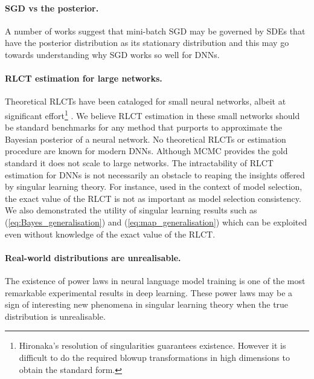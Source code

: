 \documentclass[11pt]{article}
\numberwithin{equation}{section}
\theoremstyle{plain}
\theoremstyle{definition}
\begin{document}
\paragraph{SGD vs the posterior.} A number of works \citep{Simsekli17,mandt_stochastic_2018,smith_stochastic_2018} suggest that mini-batch SGD may be governed by SDEs that have the posterior distribution as its stationary distribution and this may go towards understanding why SGD works so well for DNNs. %

\paragraph{RLCT estimation for large networks.} 
Theoretical RLCTs have been cataloged for small neural networks, albeit at significant effort\footnote{Hironaka's resolution of singularities guarantees existence. However it is difficult to do the required blowup transformations in high dimensions to obtain the standard form.} \citep{aoyagi_stochastic_2005, aoyagi_resolution_2006}. We believe RLCT estimation in these small networks should be standard benchmarks for any method that purports to approximate the Bayesian posterior of a neural network.
No theoretical RLCTs or estimation procedure are known for modern DNNs. Although MCMC provides the gold standard it does not scale to large networks.
The intractability of RLCT estimation for DNNs is not necessarily an obstacle to reaping the insights offered by singular learning theory. For instance, used in the context of model selection, the exact value of the RLCT is not as important as model selection consistency. We also demonstrated the utility of singular learning results such as (\ref{eq:Bayes_generalisation}) and (\ref{eq:map_generalisation}) which can be exploited even without knowledge of the exact value of the RLCT.

\paragraph{Real-world distributions are unrealisable.}
The existence of power laws in neural language model training \citep{hestness_2017,kaplan2020scaling} is one of the most remarkable experimental results in deep learning. These power laws may be a sign of interesting new phenomena in singular learning theory when the true distribution is unrealisable.
\end{document}
